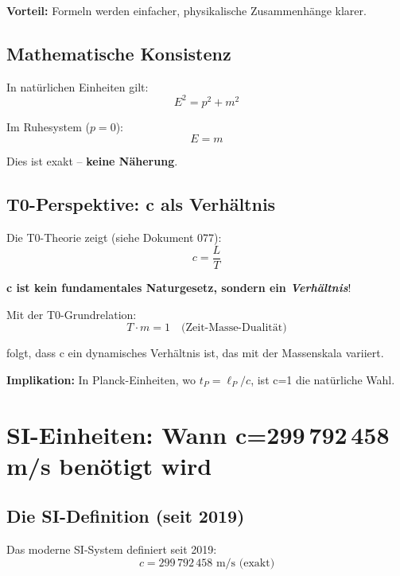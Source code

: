 	\textbf{Vorteil:} Formeln werden einfacher, physikalische Zusammenhänge klarer.
	
	\subsection{Mathematische Konsistenz}
	
	In natürlichen Einheiten gilt:
	\begin{equation}
		E^2 = p^2 + m^2
	\end{equation}
	
	Im Ruhesystem ($p=0$):
	\begin{equation}
		E = m
	\end{equation}
	
	Dies ist exakt -- \textbf{keine Näherung}.
	
	\subsection{T0-Perspektive: c als Verhältnis}
	
	Die T0-Theorie zeigt (siehe Dokument 077):
	\begin{equation}
		c = \frac{L}{T}
	\end{equation}
	
	\textbf{c ist kein fundamentales Naturgesetz, sondern ein \emph{Verhältnis}}!
	
	Mit der T0-Grundrelation:
	\begin{equation}
		T \cdot m = 1 \quad \text{(Zeit-Masse-Dualität)}
	\end{equation}
	
	folgt, dass c ein dynamisches Verhältnis ist, das mit der Massenskala variiert.
	
	\textbf{Implikation:} In Planck-Einheiten, wo $t_P = \ell_P/c$, ist c=1 die natürliche Wahl.
	
	\section{SI-Einheiten: Wann c=299\,792\,458 m/s benötigt wird}
	
	\subsection{Die SI-Definition (seit 2019)}
	
	Das moderne SI-System definiert seit 2019:
	\begin{equation}
		\boxed{c = 299\,792\,458 \text{ m/s} \text{ (exakt)}}
	\end{equation}
	
